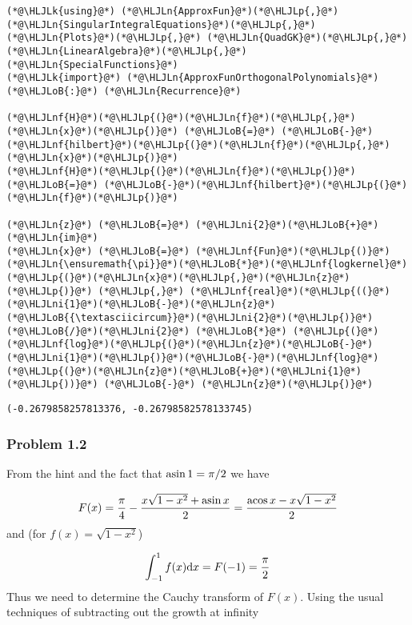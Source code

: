 \documentclass[12pt,a4paper]{article}
\newcommand{\HLJLk}[1]{\textcolor[RGB]{148,91,176}{\textbf{#1}}}
\newcommand{\HLJLn}[1]{#1}
\newcommand{\HLJLnf}[1]{\textcolor[RGB]{66,102,213}{#1}}
\newcommand{\HLJLni}[1]{\textcolor[RGB]{59,151,46}{#1}}
\newcommand{\HLJLoB}[1]{\textcolor[RGB]{102,102,102}{\textbf{#1}}}
\newcommand{\HLJLp}[1]{#1}
\def\D{ {\rm d} }
\def\acos{ {\rm acos}\, }
\def\asin{ {\rm asin}\, }
\begin{document}
\begin{lstlisting}
(*@\HLJLk{using}@*) (*@\HLJLn{ApproxFun}@*)(*@\HLJLp{,}@*) (*@\HLJLn{SingularIntegralEquations}@*)(*@\HLJLp{,}@*) (*@\HLJLn{Plots}@*)(*@\HLJLp{,}@*) (*@\HLJLn{QuadGK}@*)(*@\HLJLp{,}@*) (*@\HLJLn{LinearAlgebra}@*)(*@\HLJLp{,}@*) (*@\HLJLn{SpecialFunctions}@*)
(*@\HLJLk{import}@*) (*@\HLJLn{ApproxFunOrthogonalPolynomials}@*)(*@\HLJLoB{:}@*) (*@\HLJLn{Recurrence}@*)

(*@\HLJLnf{H}@*)(*@\HLJLp{(}@*)(*@\HLJLn{f}@*)(*@\HLJLp{,}@*)(*@\HLJLn{x}@*)(*@\HLJLp{)}@*) (*@\HLJLoB{=}@*) (*@\HLJLoB{-}@*)(*@\HLJLnf{hilbert}@*)(*@\HLJLp{(}@*)(*@\HLJLn{f}@*)(*@\HLJLp{,}@*)(*@\HLJLn{x}@*)(*@\HLJLp{)}@*)
(*@\HLJLnf{H}@*)(*@\HLJLp{(}@*)(*@\HLJLn{f}@*)(*@\HLJLp{)}@*) (*@\HLJLoB{=}@*) (*@\HLJLoB{-}@*)(*@\HLJLnf{hilbert}@*)(*@\HLJLp{(}@*)(*@\HLJLn{f}@*)(*@\HLJLp{)}@*)

(*@\HLJLn{z}@*) (*@\HLJLoB{=}@*) (*@\HLJLni{2}@*)(*@\HLJLoB{+}@*)(*@\HLJLn{im}@*)
(*@\HLJLn{x}@*) (*@\HLJLoB{=}@*) (*@\HLJLnf{Fun}@*)(*@\HLJLp{()}@*)
(*@\HLJLn{\ensuremath{\pi}}@*)(*@\HLJLoB{*}@*)(*@\HLJLnf{logkernel}@*)(*@\HLJLp{(}@*)(*@\HLJLn{x}@*)(*@\HLJLp{,}@*)(*@\HLJLn{z}@*)(*@\HLJLp{)}@*) (*@\HLJLp{,}@*) (*@\HLJLnf{real}@*)(*@\HLJLp{((}@*)(*@\HLJLni{1}@*)(*@\HLJLoB{-}@*)(*@\HLJLn{z}@*)(*@\HLJLoB{{\textasciicircum}}@*)(*@\HLJLni{2}@*)(*@\HLJLp{)}@*)(*@\HLJLoB{/}@*)(*@\HLJLni{2}@*) (*@\HLJLoB{*}@*) (*@\HLJLp{(}@*)(*@\HLJLnf{log}@*)(*@\HLJLp{(}@*)(*@\HLJLn{z}@*)(*@\HLJLoB{-}@*)(*@\HLJLni{1}@*)(*@\HLJLp{)}@*)(*@\HLJLoB{-}@*)(*@\HLJLnf{log}@*)(*@\HLJLp{(}@*)(*@\HLJLn{z}@*)(*@\HLJLoB{+}@*)(*@\HLJLni{1}@*)(*@\HLJLp{))}@*) (*@\HLJLoB{-}@*) (*@\HLJLn{z}@*)(*@\HLJLp{)}@*)
\end{lstlisting}

\begin{lstlisting}
(-0.2679858257813376, -0.26798582578133745)
\end{lstlisting}


\subsubsection{Problem 1.2}
From the hint and the fact that $\asin 1 = \pi/2$ we have

\[
F(x) = {\pi \over 4}- {x \sqrt{1-x^2} + \asin x \over 2} =
    {\acos x - x \sqrt{1-x^2} \over 2}
\]
and  (for $f(x) = \sqrt{1-x^2}$)

\[
\int_{-1}^1 f(x) \D x = F(-1) = {\pi \over 2}
\]
Thus we need to determine the Cauchy transform of $F(x)$. Using the usual techniques of subtracting out the growth at infinity
\end{document}

